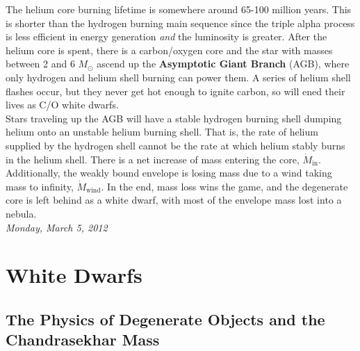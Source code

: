 \documentclass[10pt]{article}
\numberwithin{equation}{section}
\newcommand{\n}{\noindent}
\begin{document}
    \n The helium core burning lifetime is somewhere around 65-100
    million years. This is shorter than the hydrogen burning main
    sequence since the triple alpha process is less efficient in
    energy generation \emph{and} the luminosity is greater. After the
    helium core is spent, there is a carbon/oxygen core and the star
    with masses between 2 and 6 $M_\odot$ ascend up the
    \textbf{Asymptotic Giant Branch} (AGB), where only hydrogen and helium
    shell burning can power them. A series of helium shell flashes
    occur, but they never get hot enough to ignite
    carbon, so will ened their lives as C/O white dwarfs.\\

    \n Stars traveling up the AGB will have a stable hydrogen burning
    shell dumping helium onto an unstable helium burning shell. That
    is, the rate of helium supplied by the hydrogen shell cannot be
    the rate at which helium stably burns in the helium shell. There
    is a net increase of mass entering the core,
    $\dot{M}_{\mathrm{in}}$. Additionally, the weakly bound envelope
    is losing mass due to a wind taking mass to infinity,
    $\dot{M}_{\mathrm{wind}}$. In the end, mass loss wins the game,
    and the degenerate core is left behind as a white dwarf, with most
    of the envelope mass lost into a nebula.\\

    \n\textit{Monday, March 5, 2012}

    \section{White Dwarfs}
    \label{sec:endp-stell-evol}

    \subsection{The Physics of Degenerate Objects and the
      Chandrasekhar Mass}
    \label{sec:white-dwarf-cooling}
\end{document}
